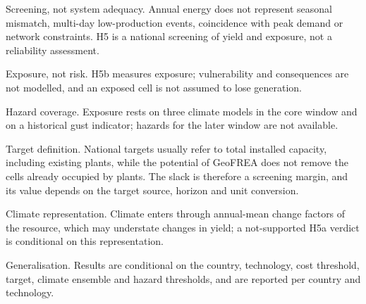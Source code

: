 Screening, not system adequacy. Annual energy does not represent seasonal
mismatch, multi-day low-production events, coincidence with peak demand or
network constraints. H5 is a national screening of yield and exposure, not a
reliability assessment.

Exposure, not risk. H5b measures exposure; vulnerability and consequences are not
modelled, and an exposed cell is not assumed to lose generation.

Hazard coverage. Exposure rests on three climate models in the core window and on
a historical gust indicator; hazards for the later window are not available.

Target definition. National targets usually refer to total installed capacity,
including existing plants, while the potential of GeoFREA does not remove the
cells already occupied by plants. The slack is therefore a screening margin, and
its value depends on the target source, horizon and unit conversion.

Climate representation. Climate enters through annual-mean change factors of the
resource, which may understate changes in yield; a not-supported H5a verdict is
conditional on this representation.

Generalisation. Results are conditional on the country, technology, cost
threshold, target, climate ensemble and hazard thresholds, and are reported per
country and technology.
